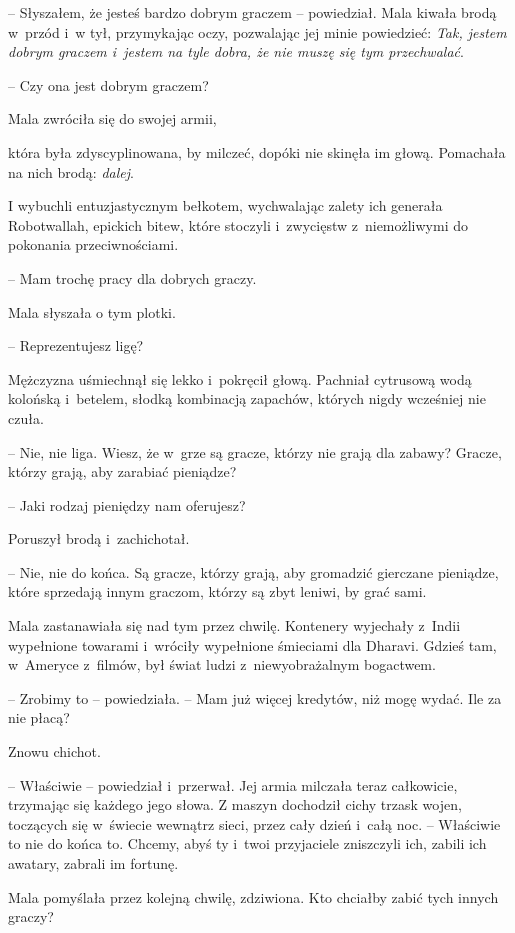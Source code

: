 \documentclass[oneside,polish,11pt,rmheadings]{mwbk}
\begin{document}
-- Słyszałem, że jesteś bardzo dobrym graczem -- powiedział. Mala kiwała brodą w~przód i~w tył, przymykając oczy, pozwalając jej minie powiedzieć: \textit{Tak, jestem dobrym graczem i~jestem na tyle dobra, że nie muszę się tym przechwalać}.  


-- Czy ona jest dobrym graczem?  


Mala zwróciła się do swojej armii, 


która była zdyscyplinowana, by milczeć, dopóki nie skinęła im głową. Pomachała na nich brodą: \textit{dalej}. 


I wybuchli entuzjastycznym bełkotem, wychwalając zalety ich generała Robotwallah, epickich bitew, które stoczyli i~zwycięstw z~niemożliwymi do pokonania przeciwnościami. 


-- Mam trochę pracy dla dobrych graczy. 


Mala słyszała o tym plotki. 

-- Reprezentujesz ligę? 


Mężczyzna uśmiechnął się lekko i~pokręcił głową. Pachniał cytrusową wodą kolońską i~betelem, słodką kombinacją zapachów, których nigdy wcześniej nie czuła. 

-- Nie, nie liga. Wiesz, że w~grze są gracze, którzy nie grają dla zabawy? Gracze, którzy grają, aby zarabiać pieniądze? 


-- Jaki rodzaj pieniędzy nam oferujesz? 


Poruszył brodą i~zachichotał. 

-- Nie, nie do końca. Są gracze, którzy grają, aby gromadzić gierczane pieniądze, które sprzedają innym graczom, którzy są zbyt leniwi, by grać sami. 


Mala zastanawiała się nad tym przez chwilę. Kontenery wyjechały z~Indii wypełnione towarami i~wróciły wypełnione śmieciami dla Dharavi. Gdzieś tam, w~Ameryce z~filmów, był świat ludzi z~niewyobrażalnym bogactwem. 

-- Zrobimy to -- powiedziała. -- Mam już więcej kredytów, niż mogę wydać. Ile za nie płacą? 


Znowu chichot. 

-- Właściwie -- powiedział i~przerwał. Jej armia milczała teraz całkowicie, trzymając się każdego jego słowa. Z maszyn dochodził cichy trzask wojen, toczących się w~świecie wewnątrz sieci, przez cały dzień i~całą noc. -- Właściwie to nie do końca to. Chcemy, abyś ty i~twoi przyjaciele zniszczyli ich, zabili ich awatary, zabrali im fortunę. 


Mala pomyślała przez kolejną chwilę, zdziwiona. Kto chciałby zabić tych innych graczy? 
\end{document}
